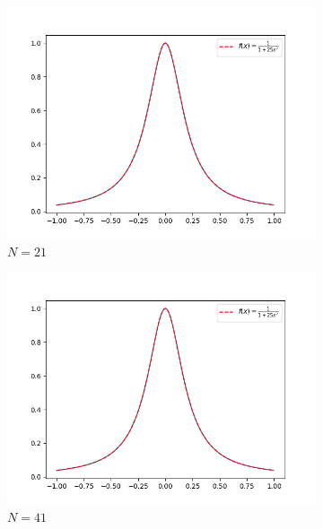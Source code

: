\documentclass[a4paper]{article}
\begin{document}
\begin{figure}[H]
\begin{subfigure}[b]{0.4\textwidth}
        \includegraphics[width=\textwidth]{../figure/A_21.png}
        \caption{$N=21$}
    \end{subfigure}
    \begin{subfigure}[b]{0.4\textwidth}
        \centering
        \includegraphics[width=\textwidth]{../figure/A_41.png}
        \caption{$N=41$}
    \end{subfigure}
    \\
    \begin{subfigure}[b]{0.4\textwidth}
        \centering

\end{subfigure}
\end{figure}
\end{document}
